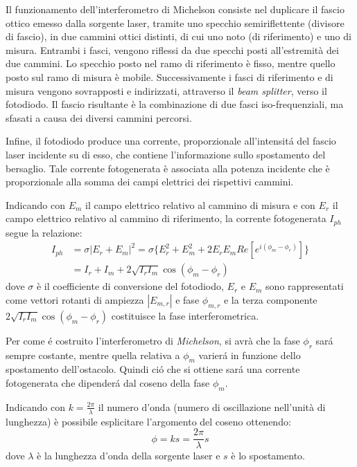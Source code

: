 Il funzionamento dell'interferometro di Michelson consiste nel duplicare il fascio ottico emesso dalla sorgente laser, tramite uno specchio semiriflettente (divisore di fascio), in due cammini ottici distinti, di cui uno noto (di riferimento) e uno di misura. Entrambi i fasci, vengono riflessi da due specchi posti all'estremità dei due cammini. Lo specchio posto nel ramo di riferimento è fisso, mentre quello posto sul ramo di misura è mobile. Successivamente i fasci di riferimento e di misura vengono sovrapposti e indirizzati, attraverso il \textit{beam splitter}, verso il fotodiodo. Il fascio risultante è la combinazione di due fasci iso-frequenziali, ma sfasati a causa dei diversi cammini percorsi.

Infine, il fotodiodo produce una corrente, proporzionale all'intensitá del fascio laser incidente su di esso, che contiene l'informazione sullo spostamento del bersaglio. Tale corrente fotogenerata è associata alla potenza incidente che è proporzionale alla somma dei campi elettrici dei rispettivi cammini.

Indicando con ${E_m}$ il campo elettrico relativo al cammino di misura e con ${E_r}$ il campo elettrico relativo al cammino di riferimento, la corrente fotogenerata $I_{ph}$ segue la relazione:
\begin{equation}
\begin{split}
	I_{ph}&=\sigma|E_r+E_m|^2=\sigma\{E_r^2+E_m^2+2E_rE_mRe[e^{i(\phi_m-\phi_r)}]\}\\
	&=I_r+I_m+2\sqrt{I_rI_m}\cos{(\phi_m-\phi_r)}
\end{split}
\end{equation}
dove $\sigma$ è il coefficiente di conversione del fotodiodo, $E_r$ e $E_m$ sono rappresentati come vettori rotanti di ampiezza $|E_{m,r}|$ e fase $\phi_{m,r}$ e la terza componente $2\sqrt{I_rI_m}\cos{(\phi_m-\phi_r)}$ costituisce la fase interferometrica. 

Per come é costruito l'interferometro di \textit{Michelson}, si avrà che la fase $\phi_r$ sará sempre costante, mentre quella relativa a $\phi_m$ varierá in funzione dello spostamento dell'ostacolo. Quindi ció che si ottiene sará una corrente fotogenerata che dipenderá dal coseno della fase $\phi_m$. 

Indicando con $k=\frac{2\pi}{\lambda}$ il numero d'onda (numero di oscillazione nell'unità di lunghezza) è possibile esplicitare l'argomento del coseno ottenendo:
\begin{equation}
	\phi=ks=\frac{2\pi}{\lambda}s	
\end{equation}
dove $\lambda$ è la lunghezza d'onda della sorgente laser e $s$ è lo spostamento.

